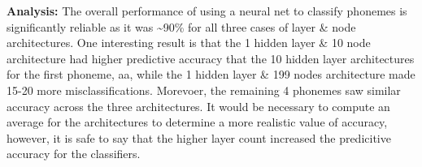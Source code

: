 \documentclass[11pt]{article}
\begin{document}
    \textbf{Analysis:} The overall performance of using a neural net to
classify phonemes is significantly reliable as it was
\textasciitilde{}90\% for all three cases of layer \& node
architectures. One interesting result is that the 1 hidden layer \& 10
node architecture had higher predictive accuracy that the 10 hidden
layer architectures for the first phoneme, aa, while the 1 hidden layer
\& 199 nodes architecture made 15-20 more misclassifications. Morevoer,
the remaining 4 phonemes saw similar accuracy across the three
architectures. It would be necessary to compute an average for the
architectures to determine a more realistic value of accuracy, however,
it is safe to say that the higher layer count increased the predicitive
accuracy for the classifiers.


    
    
    
    
\end{document}

